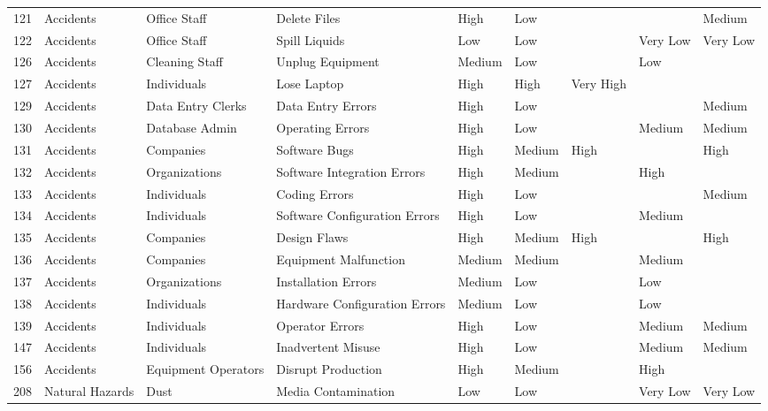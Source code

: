 \documentclass{article}
\numberwithin{equation}{section} %
\numberwithin{figure}{section} %
\numberwithin{table}{section} %
\begin{document}
\begin{center}
\begin{adjustwidth}{-4cm}{}
\begin{tabular}{ l | l | l | l | l | l | l | l | l}
    121 & Accidents & Office Staff & Delete Files & High & Low &  &  & Medium \\
    122 & Accidents & Office Staff & Spill Liquids & Low & Low &  & Very Low & Very Low \\
    126 & Accidents & Cleaning Staff & Unplug Equipment & Medium & Low &  & Low &  \\
    127 & Accidents & Individuals & Lose Laptop & High & High & Very High &  &  \\
    129 & Accidents & Data Entry Clerks & Data Entry Errors & High & Low &  &  & Medium \\
    130 & Accidents & Database Admin & Operating Errors & High & Low &  & Medium & Medium \\
    131 & Accidents & Companies & Software Bugs & High & Medium & High &  & High \\
    132 & Accidents & Organizations & Software Integration Errors & High & Medium &  & High &  \\
    133 & Accidents & Individuals & Coding Errors & High & Low &  &  & Medium \\
    134 & Accidents & Individuals & Software Configuration Errors & High & Low &  & Medium &  \\
    135 & Accidents & Companies & Design Flaws & High & Medium & High &  & High \\
    136 & Accidents & Companies & Equipment Malfunction & Medium & Medium &  & Medium &  \\
    137 & Accidents & Organizations & Installation Errors & Medium & Low &  & Low &  \\
    138 & Accidents & Individuals & Hardware Configuration Errors & Medium & Low &  & Low &  \\
    139 & Accidents & Individuals & Operator Errors & High & Low &  & Medium & Medium \\
    147 & Accidents & Individuals & Inadvertent Misuse & High & Low &  & Medium & Medium \\
    156 & Accidents & Equipment Operators & Disrupt Production & High & Medium &  & High &  \\
    208 & Natural Hazards & Dust & Media Contamination & Low & Low &  & Very Low & Very Low \\
    \hline
    \end{tabular}
\end{adjustwidth}
\end{center}
\normalsize
\end{document}
